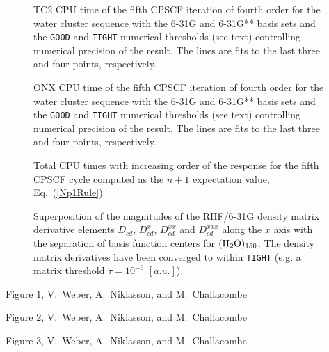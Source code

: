 \documentclass[prl,twocolumn,showpacs,twocolumngrid,superbib]{revtex4}
\begin{document}
{\begin{figure}[h]
  \caption{\protect
    TC2 CPU time of the fifth CPSCF iteration of fourth order for
    the water cluster sequence with the 6-31G and 6-31G** 
    basis sets and the {\tt GOOD} and {\tt TIGHT} 
    numerical thresholds (see text) controlling numerical
    precision of the result. The lines are fits to the 
    last three and four points, respectively.
  }\label{fig:Gamma_TC2R_Timing}

  \caption{\protect
    ONX CPU time of the fifth CPSCF iteration of fourth order for
    the water cluster sequence with the 6-31G and 6-31G** 
    basis sets and the {\tt GOOD} and {\tt TIGHT} 
    numerical thresholds (see text) controlling numerical
    precision of the result. The lines are fits to the 
    last three and four points, respectively.
  }\label{fig:Gamma_ONX_Timing}

  \caption{Total CPU times with increasing order of the response for 
           the fifth CPSCF cycle computed as the $n+1$ expectation value, Eq.~(\ref{Np1Rule}).}\label{TimeWithOrder}

  \caption{\protect
    Superposition of the magnitudes of the RHF/6-31G density matrix
    derivative elements $D_{cd}$, $D^{x}_{cd}$, $D^{xx}_{cd}$ and $D^{xxx}_{cd}$
    along the $x$ axis with the separation of basis function centers
    for $\rm (H_2O)_{150}$. The density matrix 
    derivatives have been converged to within {\tt TIGHT} (e.g. 
    a matrix threshold $\tau=10^{-6}$ $[a.u.]$).
  }\label{fig:Superposition_Decay}


\end{figure}

\clearpage

\begin{center}
Figure 1, V.~Weber, A.~Niklasson,  and M.~Challacombe \\[1.cm]
\end{center}

\clearpage

\begin{center}
Figure 2, V.~Weber, A.~Niklasson,  and M.~Challacombe \\[1.cm]
\end{center}

\clearpage

\begin{center}
Figure 3, V.~Weber, A.~Niklasson,  and M.~Challacombe \\[1.cm]
\end{center}

}
\end{document}
